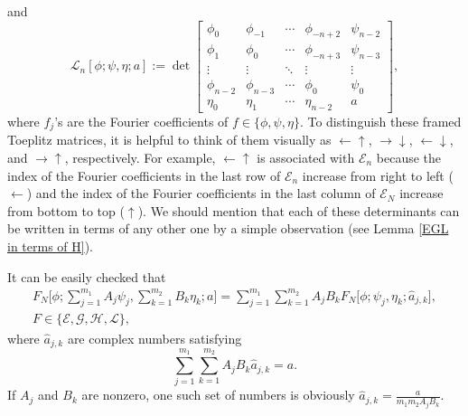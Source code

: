\documentclass[10pt,a4paper]{amsart}
\numberwithin{equation}{section}
\begin{document}
		and
		\begin{equation}\label{half-framed 3}
			\mathscr{L}_n[\phi;\psi,\eta;a] := \det \begin{bmatrix}
				\phi_0& \phi_{-1} & \cdots & \phi_{-n+2} & \psi_{n-2} \\
				\phi_{1}& \phi_0 & \cdots & \phi_{-n+3} & \psi_{n-3} \\
				\vdots & \vdots & \ddots & \vdots & \vdots \\
				\phi_{n-2} & \phi_{n-3} & \cdots & \phi_{0} & \psi_{0} \\
				\eta_{0} & \eta_{1} & \cdots & \eta_{n-2} & a
			\end{bmatrix},
		\end{equation}
		where $f_j$'s are the Fourier coefficients of $f \in \{ \phi, \psi, \eta \}$. To distinguish these framed Toeplitz matrices, it is helpful to think of them visually as $ \leftarrow \uparrow$, $\rightarrow \downarrow$, $\leftarrow \downarrow $, and $\rightarrow \uparrow$, respectively. For example, $\leftarrow \uparrow$ is associated with $\mathscr{E}_n$ because the index of the Fourier coefficients in the last row of $\boldsymbol{\mathscr{E}}_n$ increase from right to left ($\leftarrow$) and the index of the Fourier coefficients in the last column of $\boldsymbol{\mathscr{E}}_N$ increase from bottom to top ($\uparrow$). We should mention that each of these determinants can be written in terms of any other one by a simple observation (see Lemma \ref{EGL in terms of H}).
		
		It can be easily checked that
		\begin{gather}
			F_N\Bigg[\phi; \sum_{j=1}^{m_1} A_j \psi_j,\sum_{k=1}^{m_2} B_k \eta_k;a\Bigg] = \sum_{j=1}^{m_1} \sum_{k=1}^{m_2} A_j B_k F_N\big[\phi; \psi_j, \eta_k; \widehat{a}_{j,k} \big],\nonumber \\
 F \in \{\mathscr{E},\mathscr{G}, \mathscr{H}, \mathscr{L}\},\label{framed lin comb}
		\end{gather}
		where
		$\widehat{a}_{j,k}$ are complex numbers satisfying
		\begin{equation}\label{framed lin comb1}
			\sum_{j=1}^{m_1} \sum_{k=1}^{m_2} A_j B_k \widehat{a}_{j,k}= a.
		\end{equation}
		If $A_j$ and $B_k$ are nonzero, one such set of numbers is obviously
$\widehat{a}_{j,k} = \frac{a}{m_1m_2A_jB_k}$.
		
	
		
\end{document}

